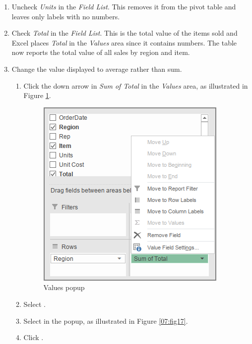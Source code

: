 \begin{enumerate}[resume]
	\item Uncheck \textit{Units} in the \textit{Field List}. This removes it from the pivot table and leaves only labels with no numbers.
	\item Check \textit{Total} in the \textit{Field List}. This is the total value of the items sold and Excel places \textit{Total} in the \textit{Values} area since it contains numbers. The table now reports the total value of all sales by region and item.
	\item Change the value displayed to average rather than sum.
	
	\begin{enumerate}
		\item Click the down arrow in \textit{Sum of Total} in the \textit{Values} area, as illustrated in Figure \ref{07:fig16}.

		\begin{figure}[H]
			\centering
			\includegraphics[width=\maxwidth{.75\linewidth}]{gfx/ch07_fig16}
			\caption{Values popup}
			\label{07:fig16}
		\end{figure}

		\item Select .
		\item Select  in the popup, as illustrated in Figure \ref{07:fig17}.
		\item Click .
	\end{enumerate}


\end{enumerate}
